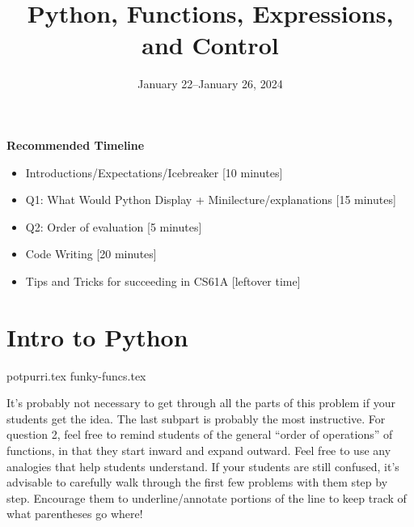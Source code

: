 \documentclass{exam}
\title{Python, Functions, Expressions, and Control}
\date{January 22--January 26, 2024}
\begin{document}
\maketitle
\begin{meta}
\textbf{Recommended Timeline}
\begin{itemize}
  \item Introductions/Expectations/Icebreaker [10 minutes]
  \item Q1: What Would Python Display + Minilecture/explanations [15 minutes]
  \item Q2: Order of evaluation [5 minutes]
  \item Code Writing [20 minutes]
  \item Tips and Tricks for succeeding in CS61A [leftover time]
\end{itemize}
\end{meta}


\section{Intro to Python}
\begin{questions}
{potpurri.tex}
{funky-funcs.tex}
\begin{questionmeta}
  It's probably not necessary to get through all the parts of this problem if your students get the idea. The last subpart is probably the most instructive. 
  For question 2, feel free to remind students of the general ``order of operations'' of functions, in that they start inward and expand outward. Feel free to use any analogies that help students understand.
  If your students are still confused, it's advisable to carefully walk through the first few problems with them step by step. Encourage them to underline/annotate portions of the line to keep track of what parentheses go where!
\end{questionmeta}
\end{questions}
\end{document}
